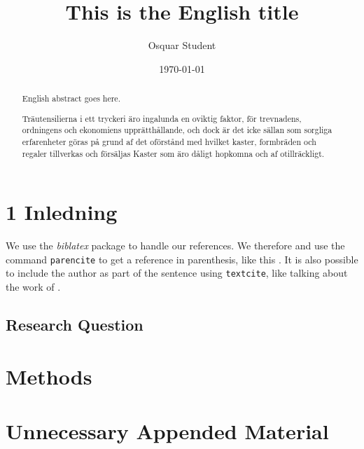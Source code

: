 \documentclass{kththesis}
\title{This is the English title}
\author{Osquar Student}
\date{\today}
\begin{document}
\frontmatter

\titlepage

\begin{abstract}
  English abstract goes here.

  \blindtext
\end{abstract}


\begin{otherlanguage}{swedish}
  \begin{abstract}
    Träutensilierna i ett tryckeri äro ingalunda en oviktig faktor,
    för trevnadens, ordningens och ekonomiens upprätthållande, och
    dock är det icke sällan som sorgliga erfarenheter göras på grund
    af det oförstånd med hvilket kaster, formbräden och regaler
    tillverkas och försäljas Kaster som äro dåligt hopkomna och af
    otillräckligt.
  \end{abstract}
\end{otherlanguage}


\tableofcontents


\mainmatter


\chapter{1 Inledning}

We use the \emph{biblatex} package to handle our references. We therefore and use the
command \texttt{parencite} to get a reference in parenthesis, like this
\parencite{heisenberg2015}.  It is also possible to include the author
as part of the sentence using \texttt{textcite}, like talking about
the work of \textcite{einstein2016}.

\Blindtext

\section{Research Question}

\blindtext

\chapter{Methods}

\blindtext

\printbibliography[heading=bibintoc] %

\appendix

\chapter{Unnecessary Appended Material}
\end{document}
